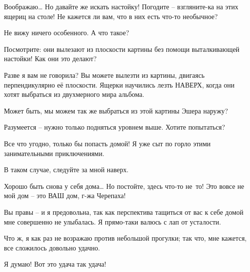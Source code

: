 \documentclass[../main.tex]{subfiles}
\begin{document}
\begin{Dialogue}
\begin{sublevel}
\begin{sublevel}
 Воображаю\ldots{} Но давайте же искать настойку! Погодите \--- взгляните-ка на этих ящериц на столе! Не кажется ли вам, что в них есть что-то необычное?

 Не вижу ничего особенного. А что такое?

 Посмотрите: они вылезают из плоскости картины без помощи выталкивающей настойки! Как они это делают?

 Разве я вам не говорила? Вы можете вылезти из картины, двигаясь перпендикулярно её плоскости. Ящерки научились лезть НАВЕРХ, когда они хотят выбраться из двухмерного мира альбома.

 Может быть, мы можем так же выбраться из этой картины Эшера наружу?

 Разумеется \--- нужно только подняться уровнем выше. Хотите попытаться?

 Все что угодно, только бы попасть домой! Я уже сыт по горло этими занимательными приключениями.

 В таком случае, следуйте за мной наверх.



\end{sublevel}

 Хорошо быть снова у себя дома\ldots{} Но постойте, здесь что-то не~то! Это вовсе не мой дом \--- это ВАШ дом, г-жа Черепаха!

 Вы правы \--- и я предовольна, так как перспектива тащиться от вас к себе домой мне совершенно не улыбалась. Я прямо-таки валюсь с лап от усталости.

 Что ж, я как раз не возражаю против небольшой прогулки; так что, мне кажется, все сложилось довольно удачно.

 Я думаю! Вот это удача так удача!


\end{sublevel}

\end{Dialogue}
\end{document}
